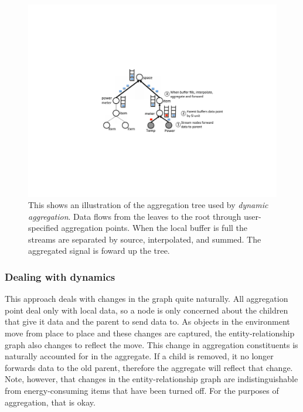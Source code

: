 \begin{figure}[htb!]
\begin{center}
\includegraphics[scale=0.6]{figs/aggtree}
\caption{This shows an illustration of the aggregation tree used by \emph{dynamic aggregation}.  Data flows from 
the leaves to the root through user-specified aggregation points.  When the local buffer is full the streams
are separated by source, interpolated, and summed.  The aggregated signal is foward up the tree.}
\label{fig:aggtree}
\end{center}
\end{figure}

\subsubsection{Dealing with dynamics}
This approach deals with changes in the graph quite naturally.  All aggregation point deal only with local data, so
a node is only concerned about the children that give it data and the parent to send data to.  As objects in the environment
move from place to place and these changes are captured, the entity-relationship graph also changes to reflect the move.
This change in aggregation constituents is naturally accounted for in the aggregate.  If a child is removed,
it no longer forwards data to the old parent, therefore the aggregate will reflect that change.
Note, however, that changes in the entity-relationship graph are indistinguishable from energy-consuming items that have
been turned off.  For the purposes of aggregation, that is okay.

